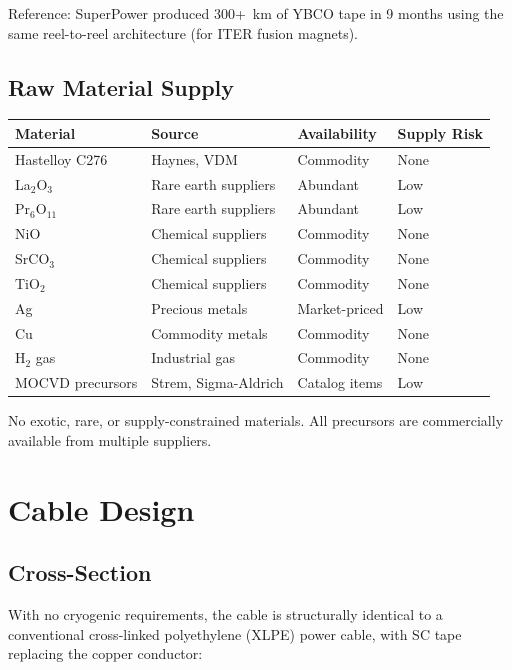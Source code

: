\documentclass[11pt, a4paper]{article}
\begin{document}
Reference: SuperPower produced 300+~km of YBCO tape in 9 months
using the same reel-to-reel architecture (for ITER fusion magnets).

\subsection{Raw Material Supply}

\begin{center}
\begin{tabular}{@{}llll@{}}
\toprule
\textbf{Material} & \textbf{Source} & \textbf{Availability} &
  \textbf{Supply Risk} \\
\midrule
Hastelloy C276 & Haynes, VDM & Commodity & None \\
La$_2$O$_3$ & Rare earth suppliers & Abundant & Low \\
Pr$_6$O$_{11}$ & Rare earth suppliers & Abundant & Low \\
NiO & Chemical suppliers & Commodity & None \\
SrCO$_3$ & Chemical suppliers & Commodity & None \\
TiO$_2$ & Chemical suppliers & Commodity & None \\
Ag & Precious metals & Market-priced & Low \\
Cu & Commodity metals & Commodity & None \\
H$_2$ gas & Industrial gas & Commodity & None \\
MOCVD precursors & Strem, Sigma-Aldrich & Catalog items & Low \\
\bottomrule
\end{tabular}
\end{center}

No exotic, rare, or supply-constrained materials. All precursors
are commercially available from multiple suppliers.

\section{Cable Design}
\label{sec:cable}

\subsection{Cross-Section}

With no cryogenic requirements, the cable is structurally identical
to a conventional cross-linked polyethylene (XLPE) power cable,
with SC tape replacing the copper conductor:
\end{document}
